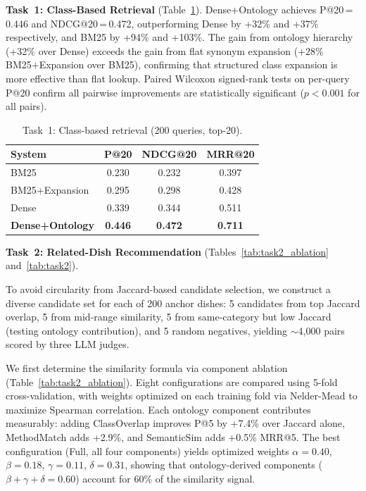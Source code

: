 \textbf{Task~1: Class-Based Retrieval} (Table~\ref{tab:task1}).
Dense+Ontology achieves P@20\,=\,0.446 and NDCG@20\,=\,0.472, outperforming Dense by +32\% and +37\% respectively, and BM25 by +94\% and +103\%. The gain from ontology hierarchy (+32\% over Dense) exceeds the gain from flat synonym expansion (+28\% BM25+Expansion over BM25), confirming that structured class expansion is more effective than flat lookup. Paired Wilcoxon signed-rank tests on per-query P@20 \cite{smucker2007sigtest} confirm all pairwise improvements are statistically significant ($p < 0.001$ for all pairs).

\begin{table}[t]
\centering
\caption{Task~1: Class-based retrieval (200 queries, top-20).}
\label{tab:task1}
\small
\begin{tabular}{lccc}
\toprule
\textbf{System} & \textbf{P@20} & \textbf{NDCG@20} & \textbf{MRR@20} \\
\midrule
BM25              & 0.230 & 0.232 & 0.397 \\
BM25+Expansion    & 0.295 & 0.298 & 0.428 \\
Dense             & 0.339 & 0.344 & 0.511 \\
\textbf{Dense+Ontology} & \textbf{0.446} & \textbf{0.472} & \textbf{0.711} \\
\bottomrule
\end{tabular}
\end{table}

\textbf{Task~2: Related-Dish Recommendation} (Tables~\ref{tab:task2_ablation} and~\ref{tab:task2}).

To avoid circularity from Jaccard-based candidate selection, we construct a diverse candidate set for each of 200 anchor dishes: 5 candidates from top Jaccard overlap, 5 from mid-range similarity, 5 from same-category but low Jaccard (testing ontology contribution), and 5 random negatives, yielding ${\sim}$4{,}000 pairs scored by three LLM judges.

We first determine the similarity formula via component ablation (Table~\ref{tab:task2_ablation}). Eight configurations are compared using 5-fold cross-validation, with weights optimized on each training fold via Nelder-Mead to maximize Spearman correlation. Each ontology component contributes measurably: adding ClassOverlap improves P@5 by +7.4\% over Jaccard alone, MethodMatch adds +2.9\%, and SemanticSim adds +0.5\% MRR@5. The best configuration (Full, all four components) yields optimized weights $\alpha = 0.40$, $\beta = 0.18$, $\gamma = 0.11$, $\delta = 0.31$, showing that ontology-derived components ($\beta + \gamma + \delta = 0.60$) account for 60\% of the similarity signal.


